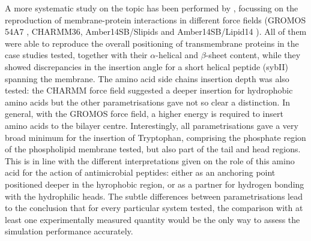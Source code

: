 A more systematic study on the topic has been performed by \citep{Sandoval-Perez2017}, focussing on the reproduction of membrane-protein interactions in different force fields (GROMOS 54A7 \citep{Schmid2011}, CHARMM36, Amber14SB/Slipids \citep{Jambeck2012} and Amber14SB/Lipid14 \citep{Dickson2014}).
%
All of them were able to reproduce the overall positioning of transmembrane proteins in the case studies tested, together with their $\alpha$-helical and $\beta$-sheet content, while they showed discrepancies in the insertion angle for a short helical peptide (sybII) spanning the membrane.
%
The amino acid side chains insertion depth was also tested: the CHARMM force field suggested a deeper insertion for hydrophobic amino acids but the other parametrisations gave not so clear a distinction. In general, with the GROMOS force field, a higher energy is required to insert amino acids to the bilayer centre.
%
Interestingly, all parametrisations gave a very broad minimum for the insertion of Tryptophan, comprising the phosphate region of the phospholipid membrane tested, but also part of the tail and head regions. This is in line with the different interpretations given on the role of this amino acid for the action of antimicrobial peptides: either as an anchoring point positioned deeper in the hyrophobic region, or as a partner for hydrogen bonding with the hydrophilic heads.
%
The subtle differences between parametrisations lead to the conclusion that for every particular system tested, the comparison with at least one experimentally measured quantity would be the only way to assess the simulation performance accurately.

